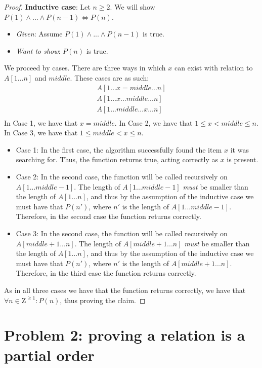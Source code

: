 \documentclass[titlepage]{article}
\begin{document}
\begin{proof}
\textbf{Inductive case}: Let $n \geq 2$.  We will show $P(1) \land ... \land P(n-1) \iff P(n)$.
\begin{itemize}
\item \emph{Given}: Assume $P(1) \land ... \land P(n-1)$ is true.
\item \emph{Want to show}: $P(n)$ is true.
\end{itemize}
We proceed by cases. There are three ways in which $x$ can exist with relation to $A[1...n]$ and $middle$. These cases are as such: 
\begin{align*}
A[1...x=middle...n] \\
A[1...x...middle...n] \\
A[1...middle...x...n] \\
\end{align*}
In Case 1, we have that $x = middle$. In Case 2, we have that $1 \leq x < middle \leq n$. In Case 3, we have that $1 \leq middle < x \leq n$.
\begin{itemize}
\item {Case 1}: In the first case, the algorithm successfully found the item $x$ it was searching for. Thus, the function returns true, acting correctly as $x$ is present.
\item {Case 2}: In the second case, the function will be called recursively on $A[1...middle-1]$. The length of $A[1...middle-1]$ \emph{must} be smaller than the length of $A[1...n]$, and thus by the assumption of the inductive case we must have that $P(n')$, where $n'$ is the length of $A[1...middle-1]$. Therefore, in the second case the function returns correctly. 
\item {Case 3}: In the second case, the function will be called recursively on $A[middle+1...n]$. The length of $A[middle+1...n]$ \emph{must} be smaller than the length of $A[1...n]$, and thus by the assumption of the inductive case we must have that $P(n')$, where $n'$ is the length of $A[middle+1...n]$. Therefore, in the third case the function returns correctly.
\end{itemize}
As in all three cases we have that the function returns correctly, we have that $\forall n \in \mathrm{Z}^{\geq 1}: P(n)$, thus proving the claim.

\end{proof}

\section{Problem 2: proving a relation is a partial order}
\end{document}
